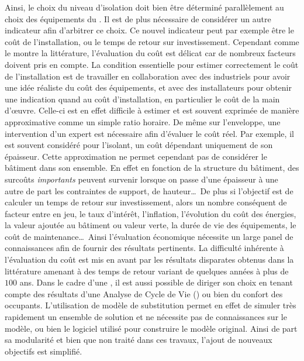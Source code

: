 Ainsi, le choix du niveau d’isolation doit bien être déterminé parallèlement au choix des
équipements du . Il est de plus nécessaire de considérer un autre indicateur afin
d’arbitrer ce choix. Ce nouvel indicateur peut par exemple être le coût de l’installation,
ou le temps de retour sur investissement. Cependant comme le montre la littérature,
l’évaluation du coût est délicat car de nombreux facteurs doivent pris en compte. La
condition essentielle pour estimer correctement le coût de l’installation est de
travailler en collaboration avec des industriels pour avoir une idée réaliste du coût des
équipements, et avec des installateurs pour obtenir une indication quand au coût
d’installation, en particulier le coût de la main d’œuvre. Celle-ci est en effet difficile
à estimer et est souvent exprimée de manière approximative comme un simple ratio horaire.
De même sur l’enveloppe, une intervention d’un expert est nécessaire afin d’évaluer le
coût réel. Par exemple, il est souvent considéré pour l’isolant, un coût dépendant
uniquement de son épaisseur. Cette approximation ne permet cependant pas de considérer le
bâtiment dans son ensemble. En effet en fonction de la structure du bâtiment, des surcoûts
\emph{importants} peuvent survenir lorsque on passe d’une épaisseur à une autre de part
les contraintes de support, de hauteur\dots\ De plus si l’objectif est de calculer un
temps de retour sur investissement, alors un nombre conséquent de facteur entre en jeu, le
taux d’intérêt, l’inflation, l’évolution du coût des énergies, la valeur ajoutée au
bâtiment ou valeur verte, la durée de vie des équipements, le coût de maintenance\dots\
Ainsi l’évaluation économique nécessite un large panel de connaissances
afin de fournir des résultats pertinents.
La difficulté inhérente à l’évaluation du coût est mis en avant par les résultats
disparates obtenus dans la littérature amenant à des temps de retour variant de quelques
années à plus de $100$ ans.
Dans le cadre d’une , il est aussi possible de diriger son choix en tenant
compte des résultats d’une Analyse de Cycle de Vie (\abr{ACV}) ou bien du confort des occupants.
L’utilisation de modèle de substitution permet en effet de simuler très rapidement
un ensemble de solution et ne nécessite pas de connaissances sur le modèle, ou bien le
logiciel utilisé pour construire le modèle original. Ainsi de part sa modularité
et bien que non traité dans ces travaux, l’ajout de nouveaux objectifs est simplifié.

